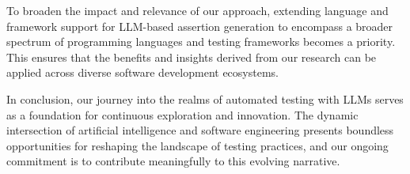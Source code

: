 To broaden the impact and relevance of our approach, extending language and framework support for LLM-based assertion generation to encompass a broader spectrum of programming languages and testing frameworks becomes a priority. This ensures that the benefits and insights derived from our research can be applied across diverse software development ecosystems.

In conclusion, our journey into the realms of automated testing with LLMs serves as a foundation for continuous exploration and innovation. The dynamic intersection of artificial intelligence and software engineering presents boundless opportunities for reshaping the landscape of testing practices, and our ongoing commitment is to contribute meaningfully to this evolving narrative.